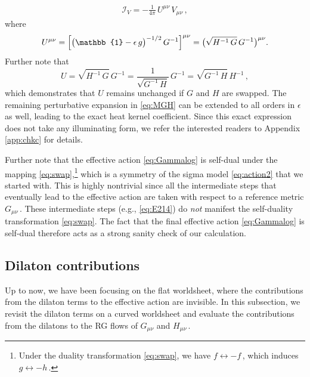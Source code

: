 \documentclass[11pt]{article}
\newcommand{\be}{\begin{equation}}
\newcommand{\ee}{\end{equation}}
\newcommand{\CI}{\mathcal{I}}
\begin{document}
%
\begin{align} \label{eq:CIV}
	\CI_V 
		= - \frac{1}{4 \pi} \, U^{\mu\nu} \, V_{\mu\nu}\,,
\end{align}
%
where
%
\be \label{eq:Udef}
	U^{\mu\nu} = \Bigl[ \bigl( \mathbb{1} - \epsilon \, g \bigr)^{-1/2} \, G^{-1} \Bigr]^{\mu\nu} = \bigl( \sqrt{H^{-1} \, G} \, G^{-1} \bigr)^{\mu\nu}.
\ee
%
Further note that
%
\be
	U = \sqrt{H^{-1} \, G} \, G^{-1} = \frac{1}{\sqrt{G^{-1} \, H}} \, G^{-1} = \sqrt{G^{-1} \, H} \, H^{-1}\,,
\ee
%
which demonstrates that $U$ remains unchanged if $G$ and $H$ are swapped. The remaining perturbative expansion in \eqref{eq:MGH} can be extended to all orders in $\epsilon$ as well, leading to the exact heat kernel coefficient. Since this exact expression does not take any illuminating form, we refer the interested readers to Appendix \ref{app:chkc} for details.

Further note that the effective action \eqref{eq:Gammalog} is self-dual under the mapping \eqref{eq:swap},\footnote{Under the duality transformation \eqref{eq:swap}, we have $f \longleftrightarrow -f$\,, which induces $g \longleftrightarrow - h$\,.} which is a symmetry of the sigma model \eqref{eq:action2} that we started with. This is highly nontrivial since all the intermediate steps that eventually lead to the effective action are taken with respect to a reference metric $G_{\mu\nu}$\,. These intermediate steps (e.g., \eqref{eq:E214}) do \emph{not} manifest the self-duality transformation \eqref{eq:swap}. The fact that the final effective action \eqref{eq:Gammalog} is self-dual therefore acts as a strong sanity check of our calculation.

\subsection{Dilaton contributions} 

Up to now, we have been focusing on the flat worldsheet, where the contributions from the dilaton terms to the effective action are invisible. In this subsection, we revisit the dilaton terms on a curved worldsheet and evaluate the contributions from the dilatons to the RG flows of $G_{\mu\nu}$ and $H_{\mu\nu}$\,. 
\end{document}
